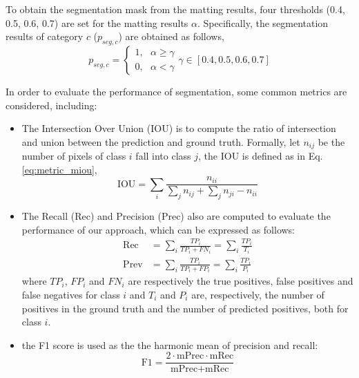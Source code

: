 \documentclass[journal]{IEEEtran}
\begin{document}
To obtain the segmentation mask from the matting results, four thresholds (0.4, 0.5, 0.6, 0.7) are set for the matting results $\alpha$. Specifically, the segmentation results of category $c$ ($p_{seg,c}$) are obtained as follows,\
\begin{equation}
    p_{seg,c} = 
    \begin{cases}
        1,~~~\alpha \geq \gamma \\
        0,~~~\alpha < \gamma 
    \end{cases} 
    \gamma \in \left[0.4, 0.5, 0.6, 0.7 \right]
    \label{eq:obtain_seg}
\end{equation}

In order to evaluate the performance of segmentation, some common metrics are considered, including:
\begin{itemize}
    \item The Intersection Over Union (IOU) is to compute the ratio of intersection and union between the prediction and ground truth. Formally, let $n_{ij}$ be the number of pixels of class $i$ fall into class $j$, the IOU is defined as in Eq. \ref{eq:metric_miou},
    \begin{equation}
        \text{IOU} = \sum\limits_{i}\frac{n_{ii}}{\sum\limits_{j} n_{ij} + \sum\limits_{j}n_{ji} - n_{ii}}
        \label{eq:metric_miou}
    \end{equation}

    \item The Recall (Rec) and Precision (Prec) also are computed to evaluate the performance of our approach, which can be expressed as follows:
    \begin{equation}
        \begin{aligned}
        \text{Rec} &= \sum\limits_{i} \frac{TP_i}{TP_i + FN_i}  = \sum\limits_{i} \frac{TP_i}{T_i} \\
        \text{Prev} &= \sum\limits_{i} \frac{TP_i}{TP_i + FP_i}  = \sum\limits_{i} \frac{TP_i}{P_i}
        \end{aligned}
        \label{eq:metric_rec_prev}
    \end{equation}
    where $TP_i$, $FP_i$ and $FN_i$ are respectively the true positives, false positives and false negatives for class $i$ and $T_i$ and $P_i$ are, respectively, the number of positives in the ground truth and the number of predicted positives, both for class $i$. 

    \item the F1 score is used as the the harmonic mean of precision and recall:
    \begin{equation}
        \text{F1} = \frac{2 \cdot \text{mPrec} \cdot \text{mRec}}{\text{mPrec} + \text{mRec}}
        \label{eq:metric_f1}
    \end{equation}
\end{itemize}
\end{document}
